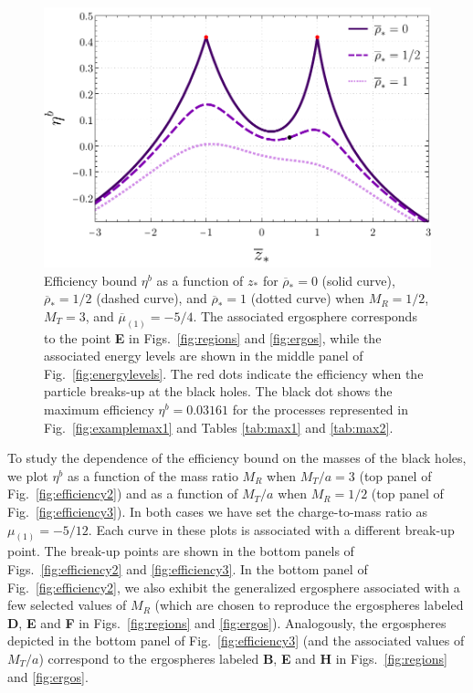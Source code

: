 \begin{figure}[!ht]
  \centering
  \includegraphics[width=\linewidth]{img/penrose_binaries/fig7.pdf}
  \caption{Efficiency bound $\eta ^ b$ as a function of $z_*$ for $\overline \rho_*=0$ (solid curve), $\overline \rho_*=1/2$ (dashed curve), and $\overline \rho_*=1$ (dotted curve) when $M_R=1/2$, $M_T=3$, and $\overline \mu_{(1)} = -5/4$. The associated ergosphere corresponds to the point \textbf{E} in Figs.~\ref{fig:regions} and \ref{fig:ergos}, while the associated energy levels are shown in the middle panel of Fig.~\ref{fig:energylevels}. The red dots indicate the efficiency when the particle breaks-up at the black holes. The black dot shows the maximum efficiency $\eta^b = 0.03161$ for the processes represented in Fig.~\ref{fig:examplemax1} and Tables \ref{tab:max1} and \ref{tab:max2}.}
  \label{fig:efficiency0}
\end{figure}

To study the dependence of the efficiency bound on the masses of the black holes, we plot $\eta ^{b}$ as a function of the mass ratio $M_R$ when $M_T/a=3$ (top panel of Fig.~\ref{fig:efficiency2}) and as a function of $M_T/a$ when $M_R=1/2$  (top panel of Fig.~\ref{fig:efficiency3}). In both cases we have set the charge-to-mass ratio as $\mu_{(1)} = -5/12$. Each curve in these plots is associated with a different break-up point. The break-up points are shown in the bottom panels of Figs.~\ref{fig:efficiency2} and \ref{fig:efficiency3}. In the bottom panel of Fig.~\ref{fig:efficiency2}, we also exhibit the generalized ergosphere associated with a few selected values of $M_R$ (which are chosen to reproduce the ergospheres labeled \textbf{D}, \textbf{E} and \textbf{F} in Figs.~\ref{fig:regions} and \ref{fig:ergos}). Analogously, the ergospheres depicted in the bottom panel of Fig.~\ref{fig:efficiency3} (and the associated values of $M_T/a$) correspond to the ergospheres labeled \textbf{B}, \textbf{E} and \textbf{H} in Figs.~\ref{fig:regions} and \ref{fig:ergos}.

